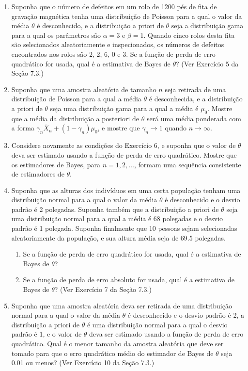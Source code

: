 \begin{enumerate}
    \item Suponha que o número de defeitos em um rolo de 1200 pés de fita de gravação magnética tenha uma distribuição de Poisson para a qual o valor da média $\theta$ é desconhecido, e a distribuição a priori de $\theta$ seja a distribuição gama para a qual os parâmetros são $\alpha=3$ e $\beta=1$. Quando cinco rolos desta fita são selecionados aleatoriamente e inspecionados, os números de defeitos encontrados nos rolos são 2, 2, 6, 0 e 3. Se a função de perda de erro quadrático for usada, qual é a estimativa de Bayes de $\theta$? (Ver Exercício 5 da Seção 7.3.)
    
    \item Suponha que uma amostra aleatória de tamanho $n$ seja retirada de uma distribuição de Poisson para a qual a média $\theta$ é desconhecida, e a distribuição a priori de $\theta$ seja uma distribuição gama para a qual a média é $\mu_0$. Mostre que a média da distribuição a posteriori de $\theta$ será uma média ponderada com a forma $\gamma_n \bar{X}_n + (1-\gamma_n)\mu_0$, e mostre que $\gamma_n \to 1$ quando $n \to \infty$.
    
    \item Considere novamente as condições do Exercício 6, e suponha que o valor de $\theta$ deva ser estimado usando a função de perda de erro quadrático. Mostre que os estimadores de Bayes, para $n=1, 2, \dots$, formam uma sequência consistente de estimadores de $\theta$.
    
    \item Suponha que as alturas dos indivíduos em uma certa população tenham uma distribuição normal para a qual o valor da média $\theta$ é desconhecido e o desvio padrão é 2 polegadas. Suponha também que a distribuição a priori de $\theta$ seja uma distribuição normal para a qual a média é 68 polegadas e o desvio padrão é 1 polegada. Suponha finalmente que 10 pessoas sejam selecionadas aleatoriamente da população, e sua altura média seja de 69.5 polegadas.
    \begin{enumerate}[label=(\alph*)]
        \item Se a função de perda de erro quadrático for usada, qual é a estimativa de Bayes de $\theta$?
        \item Se a função de perda de erro absoluto for usada, qual é a estimativa de Bayes de $\theta$? (Ver Exercício 7 da Seção 7.3.)
    \end{enumerate}
    
    \item Suponha que uma amostra aleatória deva ser retirada de uma distribuição normal para a qual o valor da média $\theta$ é desconhecido e o desvio padrão é 2, a distribuição a priori de $\theta$ é uma distribuição normal para a qual o desvio padrão é 1, e o valor de $\theta$ deva ser estimado usando a função de perda de erro quadrático. Qual é o menor tamanho da amostra aleatória que deve ser tomado para que o erro quadrático médio do estimador de Bayes de $\theta$ seja 0.01 ou menos? (Ver Exercício 10 da Seção 7.3.)
    

\end{enumerate}
